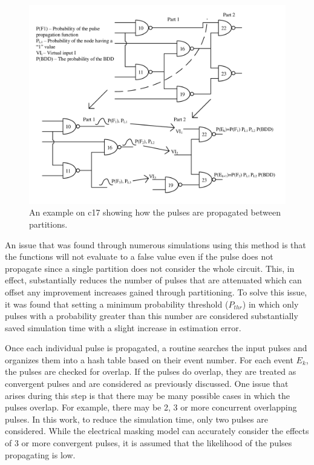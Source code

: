 \begin{figure}[!htbp]
	\centering
	\includegraphics[width=\linewidth]{Figures/PartProp}
	\caption{An example on c17 showing how the pulses are propagated between partitions.}
	\label{PART_PROP}
\end{figure}

An issue that was found through numerous simulations using this method is that the functions will not evaluate to a false value even if the pulse does not propagate since a single partition does not consider the whole circuit. This, in effect, substantially reduces the number of pulses that are attenuated which can offset any improvement increases gained through partitioning. To solve this issue, it was found that setting a minimum probability threshold ($P_{thr}$) in which only pulses with a probability greater than this number are considered substantially saved simulation time with a slight increase in estimation error.

Once each individual pulse is propagated, a routine searches the input pulses and organizes them into a hash table based on their event number. For each event $E_k$, the pulses are checked for overlap. If the pulses do overlap, they are treated as convergent pulses and are considered as previously discussed. One issue that arises during this step is that there may be many possible cases in which the pulses overlap. For example, there may be 2, 3 or more concurrent overlapping pulses. In this work, to reduce the simulation time, only two pulses are considered. While the electrical masking model can accurately consider the effects of 3 or more convergent pulses, it is assumed that the likelihood of the pulses propagating is low.

